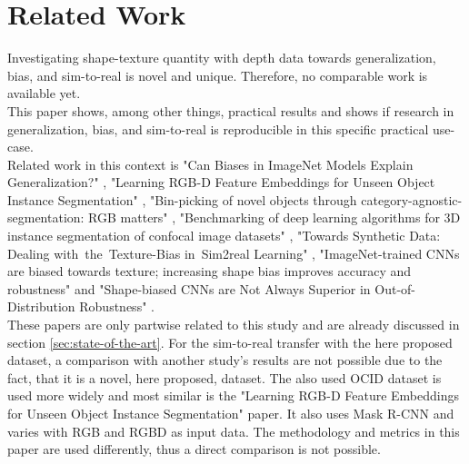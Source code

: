 	\section{Related Work}
	\label{sec:related-work}
		Investigating shape-texture quantity with depth data towards generalization, bias, and sim-to-real is novel and unique. Therefore, no comparable work is available yet. \\
		This paper shows, among other things, practical results and shows if research in generalization, bias, and sim-to-real is reproducible in this specific practical use-case.\\
		Related work in this context is "Can Biases in ImageNet Models Explain Generalization?" \cite{Gavrikov2024}, "Learning RGB-D Feature Embeddings for Unseen Object Instance Segmentation" \cite{Xiang2021}, "Bin-picking of novel objects through category-agnostic-segmentation: RGB matters" \cite{Raj2023}, "Benchmarking of deep learning algorithms for 3D instance segmentation of confocal image datasets" \cite{Kar2022}, "Towards Synthetic Data: Dealing with the Texture-Bias in Sim2real Learning" \cite{Tabak2023}, "ImageNet-trained CNNs are biased towards texture; increasing shape bias improves accuracy and robustness" \cite{Geirhos2022} and "Shape-biased CNNs are Not Always Superior in Out-of-Distribution Robustness" \cite{Qiu2024}.\\
		These papers are only partwise related to this study and are already discussed in section \ref{sec:state-of-the-art}.
		For the sim-to-real transfer with the here proposed dataset, a comparison with another study's results are not possible due to the fact, that it is a novel, here proposed, dataset. The also used OCID dataset \cite{Suchi2019} is used more widely and most similar is the "Learning RGB-D Feature Embeddings for Unseen Object Instance Segmentation" \cite{Xiang2021} paper. It also uses Mask R-CNN \cite{Kaiming2017} and varies with RGB and RGBD as input data. The methodology and metrics in this paper are used differently, thus a direct comparison is not possible. %
		
	
